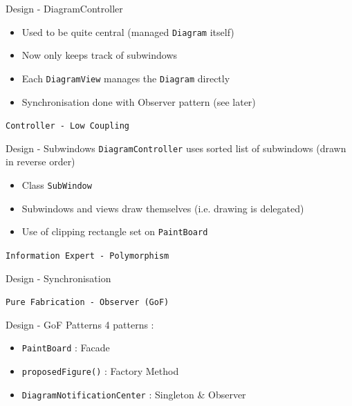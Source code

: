 \documentclass[10pt]{beamer}
\begin{document}
\begin{frame}[fragile]{Design - DiagramController}
\begin{itemize}
\item Used to be quite central (managed \texttt{Diagram} itself)
\item Now only keeps track of subwindows
\item Each \texttt{DiagramView} manages the \texttt{Diagram} directly
\item Synchronisation done with Observer pattern (see later)
\end{itemize}
\begin{center}
\vspace{1cm}
\texttt{Controller - Low Coupling}
\end{center}
\end{frame}

\begin{frame}[fragile]{Design - Subwindows}
\texttt{DiagramController} uses sorted list of subwindows (drawn in reverse order)
\begin{itemize}
\item Class \texttt{SubWindow}
\item Subwindows and views draw themselves (i.e. drawing is delegated)
\item Use of clipping rectangle set on \texttt{PaintBoard}
\end{itemize}
\begin{center}
\vspace{1cm}
\texttt{Information Expert - Polymorphism}
\end{center}
\end{frame}

\begin{frame}[fragile]{Design - Synchronisation}
\begin{center}
\vspace{1cm}
\texttt{Pure Fabrication - Observer (GoF)}
\end{center}
\end{frame}

\begin{frame}[fragile]{Design - GoF Patterns}
4 patterns :
\begin{itemize}
\item \texttt{PaintBoard} : Facade
\item \texttt{proposedFigure()} : Factory Method
\item \texttt{DiagramNotificationCenter} : Singleton \& Observer
\end{itemize}
\end{frame}
\end{document}
